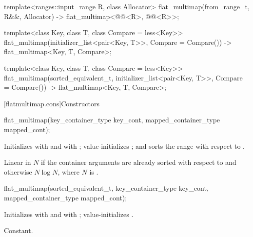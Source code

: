 \begin{addedblock}
\begin{codeblock}
{  template<ranges::input_range R, class Allocator>
    flat_multimap(from_range_t, R&&, Allocator)
      -> flat_multimap<@@<R>, @@<R>>;

  template<class Key, class T, class Compare = less<Key>>
    flat_multimap(initializer_list<pair<Key, T>>, Compare = Compare())
      -> flat_multimap<Key, T, Compare>;

  template<class Key, class T, class Compare = less<Key>>
  flat_multimap(sorted_equivalent_t, initializer_list<pair<Key, T>>,
                Compare = Compare())
      -> flat_multimap<Key, T, Compare>;
}
\end{codeblock}

[flatmultimap.cons]{Constructors}

%
\begin{itemdecl}
flat_multimap(key_container_type key_cont, mapped_container_type mapped_cont);
\end{itemdecl}

\begin{itemdescr}
\pnum
\effects Initializes  with  and
 with ; value-initializes
; and sorts the range  with respect to
.

\pnum
\complexity
Linear in $N$ if the container arguments are already sorted with respect
to  and otherwise $N \log N$, where $N$
is .
\end{itemdescr}

%
\begin{itemdecl}
flat_multimap(sorted_equivalent_t, key_container_type key_cont,
              mapped_container_type mapped_cont);
\end{itemdecl}

\begin{itemdescr}
\pnum
\effects Initializes  with
 and  with
; value-initializes .

\pnum
\complexity
Constant.
\end{itemdescr}


\end{addedblock}
